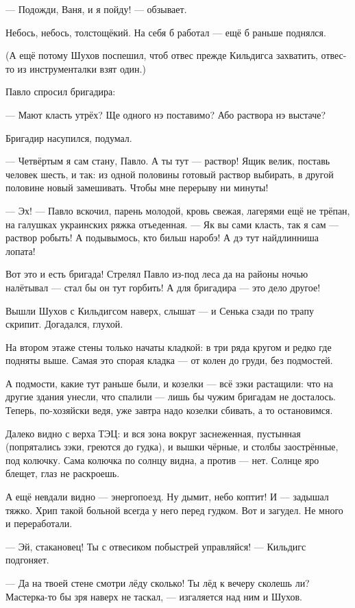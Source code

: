 --- Подожди, Ваня, и я пойду! --- обзывает.

Небось, небось, толстощёкий. На себя б работал --- ещё б раньше поднялся.

(А ещё потому Шухов поспешил, чтоб отвес прежде Кильдигса захватить, отвес-то из 
инструменталки взят один.)

Павло спросил бригадира:

--- Мают класть утрёх? Ще одного нэ поставимо? Або раствора нэ выстаче?

Бригадир насупился, подумал.

--- Четвёртым я сам стану, Павло. А ты тут --- раствор! Ящик велик, поставь человек шесть, и так: 
из одной половины готовый раствор выбирать, в другой половине новый замешивать. Чтобы мне 
перерыву ни минуты!

--- Эх! --- Павло вскочил, парень молодой, кровь свежая, лагерями ещё не трёпан, на галушках 
украинских ряжка отъеденная. --- Як вы сами класть, так я сам --- раствор робыть! А подывымось, 
кто бильш наробэ! А дэ тут найдлинниша лопата!

Вот это и есть бригада! Стрелял Павло из-под леса да на районы ночью налётывал --- стал бы он 
тут горбить! А для бригадира --- это дело другое!

Вышли Шухов с Кильдигсом наверх, слышат --- и Сенька сзади по трапу скрипит. Догадался, глухой.

На втором этаже стены только начаты кладкой: в три ряда кругом и редко где подняты выше. 
Самая это спорая кладка --- от колен до груди, без подмостей.

А подмости, какие тут раньше были, и козелки --- всё зэки растащили: что на другие здания 
унесли, что спалили --- лишь бы чужим бригадам не досталось. Теперь, по-хозяйски ведя, уже 
завтра надо козелки сбивать, а то остановимся.

Далеко видно с верха ТЭЦ: и вся зона вокруг заснеженная, пустынная (попрятались зэки, греются 
до гудка), и вышки чёрные, и столбы заострённые, под колючку. Сама колючка по солнцу видна, а 
против --- нет. Солнце яро блещет, глаз не раскроешь.

А ещё невдали видно --- энергопоезд. Ну дымит, небо коптит! И --- задышал тяжко. Хрип такой 
больной всегда у него перед гудком. Вот и загудел. Не много и переработали.

--- Эй, стакановец! Ты с отвесиком побыстрей управляйся! --- Кильдигс подгоняет.

--- Да на твоей стене смотри лёду сколько! Ты лёд к вечеру сколешь ли? Мастерка-то бы зря наверх 
не таскал, --- изгаляется над ним и Шухов.

